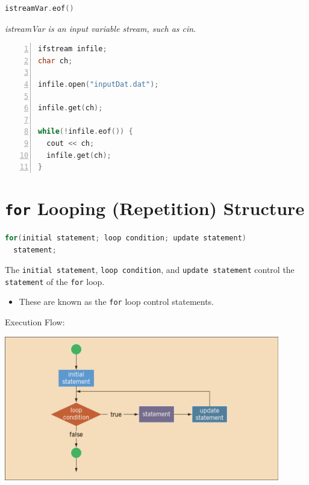 \documentclass{article}
\begin{document}
\begin{lstlisting}[language=C++, caption={\texttt{eof} Function Syntax}]
istreamVar.eof()
\end{lstlisting}
\textit{istreamVar is an input variable stream, such as cin}.

\begin{lstlisting}[language=C++, caption={\texttt{eof} Example},
  numbers=left]
ifstream infile;
char ch;

infile.open("inputDat.dat");

infile.get(ch);

while(!infile.eof()) {
  cout << ch;
  infile.get(ch);
}
\end{lstlisting}

\section{\texttt{for} Looping (Repetition) Structure}

\begin{lstlisting}[language=C++, caption={\texttt{for} Loop Syntax}]
for(initial statement; loop condition; update statement)
  statement;
\end{lstlisting}

The \texttt{initial statement}, \texttt{loop condition}, and \texttt{update
statement} control the \texttt{statement} of the \texttt{for} loop.
\begin{itemize}
  \item These are known as the \texttt{for} loop control statements.
\end{itemize}

\vspace{8pt}
Execution Flow:
\begin{center}
    \includegraphics[width=0.9\textwidth]{for-exec-flow.png}
\end{center}
\end{document}
